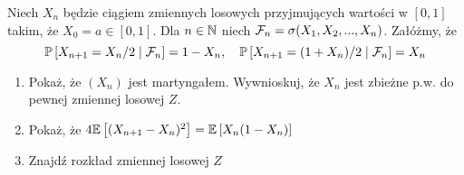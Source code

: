 \begin{problem}
  Niech $X_n$ będzie ciągiem zmiennych losowych przyjmujących wartości w $[0,1]$ takim, że $X_0=a\in[0,1]$. Dla $n\in\operatorname{\mathbb{N}}$ niech $\mathcal{F}_n=\sigma(X_1,X_2,...,X_n)$. Załóżmy, że
  $$\prob{X_{n+1}=X_n/2}{\set{F}_n}=1-X_n,\quad \prob{X_{n+1}=(1+X_n)/2}{\set{F}_n}=X_n$$
  \begin{enumerate}[label=(\alph*)]
    \item Pokaż, że $(X_n)$ jest martyngałem. Wywnioskuj, że $X_n$ jest zbieżne p.w. do pewnej zmiennej losowej $Z$.
    \item Pokaż, że $4\expected{(X_{n+1}-X_n)^2}=\expected{X_n(1-X_n)}$
    \item Znajdź rozkład zmiennej losowej $Z$
  \end{enumerate}
\end{problem}

\begin{solution}
\end{solution}

